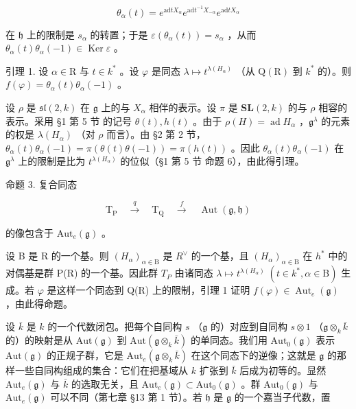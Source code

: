 \[
\theta_ {\alpha} (t) = e ^ {\mathrm{ad} t X _ {\alpha}} e ^ {\mathrm{ad} t ^ {- 1} X _ {- \alpha}} e ^ {\mathrm{ad} t X _ {\alpha}}
\]

在 \(\mathfrak{h}\) 上的限制是 \(s_{\alpha}\) 的转置；于是 \(\varepsilon(\theta_{\alpha}(t)) = s_{\alpha}\) ，从而 \(\theta_{\alpha}(t)\theta_{\alpha}(-1) \in \operatorname{Ker} \varepsilon\) 。

引理 1. 设 \(\alpha \in \mathrm{R}\) 与 \(t\in k^{*}\) 。设 \(\varphi\) 是同态 \(\lambda \mapsto t^{\lambda (H_{\alpha})}\) （从 \(\mathrm{Q(R)}\) 到 \(k^*\) 的）。则 \(f(\varphi) = \theta_{\alpha}(t)\theta_{\alpha}(-1)\) 。

设 \(\rho\) 是 \(\mathfrak{sl}(2,k)\) 在 \(\mathfrak{g}\) 上的与 \(X_{\alpha}\) 相伴的表示。设 \(\pi\) 是 \(\mathbf{SL}(2,k)\) 的与 \(\rho\) 相容的表示。采用 §1 第 5 节 的记号 \(\theta(t), h(t)\) 。由于 \(\rho(H) = \operatorname{ad} H_{\alpha}\) ，\(\mathfrak{g}^{\lambda}\) 的元素的权是 \(\lambda(H_{\alpha})\) （对 \(\rho\) 而言）。由 §2 第 2 节，\(\theta_{\alpha}(t)\theta_{\alpha}(-1) = \pi(\theta(t)\theta(-1)) = \pi(h(t))\) 。因此 \(\theta_{\alpha}(t)\theta_{\alpha}(-1)\) 在 \(\mathfrak{g}^{\lambda}\) 上的限制是比为 \(t^{\lambda(H_{\alpha})}\) 的位似（§1 第 5 节 命题 6），由此得引理。

命题 3. 复合同态

\[
\mathrm{T} _ {\mathrm{P}} \quad \xrightarrow {q} \quad \mathrm{T} _ {\mathrm{Q}} \quad \xrightarrow {f} \quad \operatorname{Aut} (\mathfrak {g}, \mathfrak {h})
\]

的像包含于 \(\mathrm{Aut}_e(\mathfrak{g})\) 。

设 B 是 R 的一个基。则 \((H_{\alpha})_{\alpha\in\mathrm{B}}\) 是 \(R^{\vee}\) 的一个基，且 \((H_{\alpha})_{\alpha\in\mathrm{B}}\) 在 \(h^{*}\) 中的对偶基是群 P(R) 的一个基。因此群 \(T_{P}\) 由诸同态 \(\lambda\mapsto t^{\lambda(H_{\alpha})}\;(t\in k^{*},\alpha\in\mathrm{B})\) 生成。若 \(\varphi\) 是这样一个同态到 Q(R) 上的限制，引理 1 证明 \(f(\varphi)\in\operatorname{Aut}_{e}(\mathfrak{g})\) ，由此得命题。

设 \(\bar{k}\) 是 \(k\) 的一个代数闭包。把每个自同构 \(s\) （\(\mathfrak{g}\) 的）对应到自同构 \(s \otimes 1\) （\(\mathfrak{g} \otimes_k \bar{k}\) 的）的映射是从 \(\mathrm{Aut}(\mathfrak{g})\) 到 \(\mathrm{Aut}(\mathfrak{g} \otimes_k \bar{k})\) 的单同态。我们用 \(\mathrm{Aut}_0(\mathfrak{g})\) 表示 \(\mathrm{Aut}(\mathfrak{g})\) 的正规子群，它是 \(\mathrm{Aut}_e(\mathfrak{g} \otimes_k \bar{k})\) 在这个同态下的逆像；这就是 \(\mathfrak{g}\) 的那样一些自同构组成的集合：它们在把基域从 \(k\) 扩张到 \(\bar{k}\) 后成为初等的。显然 \(\mathrm{Aut}_e(\mathfrak{g})\) 与 \(\bar{k}\) 的选取无关，且 \(\mathrm{Aut}_e(\mathfrak{g}) \subset \mathrm{Aut}_0(\mathfrak{g})\) 。群 \(\mathrm{Aut}_0(\mathfrak{g})\) 与 \(\mathrm{Aut}_e(\mathfrak{g})\) 可以不同（第七章 §13 第 1 节）。若 \(\mathfrak{h}\) 是 \(\mathfrak{g}\) 的一个嘉当子代数，置

